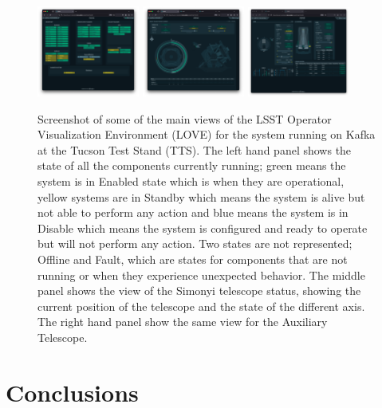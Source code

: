 \documentclass[]{spie}  %
\begin{document}
\begin{figure}[h]
  \centering
  \includegraphics[width=0.3\textwidth]{figures/swd1.png}
  \includegraphics[width=0.3\textwidth]{figures/swd2.png}
  \includegraphics[width=0.3\textwidth]{figures/swd3.png}
  \caption{
    Screenshot of some of the main views of the LSST Operator Visualization Environment (LOVE) for the system running on Kafka at the Tucson Test Stand (TTS).
    The left hand panel shows the state of all the components currently running; green means the system is in Enabled state which is when they are operational, yellow systems are in Standby which means the system is alive but not able to perform any action and blue means the system is in Disable which means the system is configured and ready to operate but will not perform any action.
    Two states are not represented; Offline and Fault, which are states for components that are not running or when they experience unexpected behavior.
    The middle panel shows the view of the Simonyi telescope status, showing the current position of the telescope and the state of the different axis.
    The right hand panel show the same view for the Auxiliary Telescope.
  }\label{fig:swd}
\end{figure}


\section{Conclusions}
\label{sec:conclusions}
\end{document}
